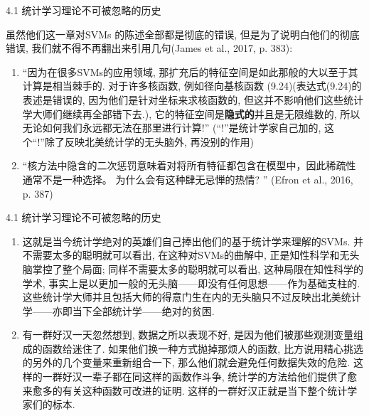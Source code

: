 \documentclass[compress,10pt,dvipsnames,notheorems]{beamer} %
\begin{document}
\begin{frame}{4.1 统计学习理论不可被忽略的历史}
\begin{solu}
虽然他们这一章对SVMs 的陈述全部都是彻底的错误, 但是为了说明白他们的彻底错误, 我们就不得不再翻出来引用几句(James et al., 2017, p. 383):
\end{solu}
\begin{enumerate}
\item “因为在很多SVMs的应用领域, 那扩充后的特征空间是如此那般的大以至于其计算是相当棘手的. 对于许多核函数, 例如径向基核函数 (9.24)(表达式(9.24)的表述是错误的, 因为他们是针对坐标来求核函数的, 但这并不影响他们这些统计学大师们继续再全部错下去.), 它的特征空间是\textbf{隐式的}并且是无限维数的, 所以无论如何我们永远都无法在那里进行计算!” (“!”是统计学家自己加的, 这个“!”除了反映北美统计学的无头脑外, 再没别的作用)
\item “核方法中隐含的二次惩罚意味着对将所有特征都包含在模型中，因此稀疏性通常不是一种选择。 为什么会有这种肆无忌惮的热情? ” (Efron et al., 2016, p. 387)
\end{enumerate}
\end{frame}

\begin{frame}{4.1 统计学习理论不可被忽略的历史}
\begin{enumerate}
\item 这就是当今\textsf{统计学绝对的英雄们}自己捧出他们的基于统计学来理解的SVMs. 并不需要太多的聪明就可以看出, 在这种对SVMs的曲解中, 正是知性科学和无头脑掌控了整个局面; 同样不需要太多的聪明就可以看出, 这种局限在知性科学的学术, 事实上是以更加一般的无头脑——即没有任何思想——作为基础支柱的. 这些统计学大师并且包括大师的得意门生在内的无头脑只不过反映出北美统计学——亦即当下全部统计学——绝对的贫困. 
\item 有一群好汉一天忽然想到, 数据之所以表现不好, 是因为他们被那些观测变量组成的函数给迷住了. 如果他们换一种方式抛掉那烦人的函数, 比方说用精心挑选的另外的几个变量来重新组合一下, 那么他们就会避免任何数据失效的危险. 这样的一群好汉一辈子都在同这样的函数作斗争, 统计学的方法给他们提供了愈来愈多的有关这种函数可改进的证明. 这样的一群好汉正就是当下整个统计学家们的标本.
\end{enumerate}
\end{frame}
\end{document}
